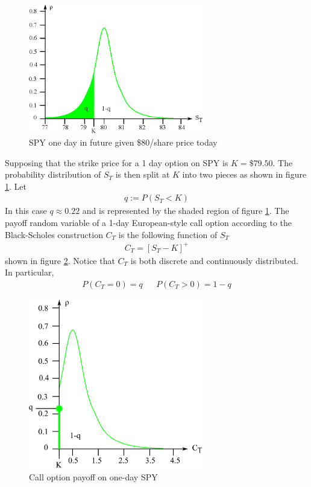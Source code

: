 \begin{figure}
  \centering
  \includegraphics[width=3in]{Images/SPY_purchase_split.eps}
  \caption[SPY one day in future given \$80/share price today]
          {SPY one day in future given \$80/share price today}
  \label{fig:SPY_purchase_split}
\end{figure}

Supposing that the strike price for a 1 day option on SPY is $K = \$79.50$. The probability distribution of $S_T$ is then split at $K$ into two pieces as shown in figure \ref{fig:SPY_purchase_split}. Let
\begin{align*}
q := P(S_T < K)
\end{align*}
In this case $q \approx 0.22$ and is represented by the shaded region of figure \ref{fig:SPY_purchase_split}. The payoff random variable of a 1-day European-style call option according to the Black-Scholes construction $C_T$ is the following function of $S_T$
\begin{align*}
C_T = [S_T - K]^+
\end{align*}
shown in figure \ref{fig:SPY_purchase_call}. Notice that $C_T$ is both discrete and continuously distributed. In particular,
\begin{align*}
P(C_T = 0) = q && P(C_T > 0) = 1-q
\end{align*}

\begin{figure}
  \centering
  \includegraphics[width=3in]{Images/SPY_purchase_call.eps}
  \caption[Call option payoff on one-day SPY]
          {Call option payoff on one-day SPY}
  \label{fig:SPY_purchase_call}
\end{figure}

